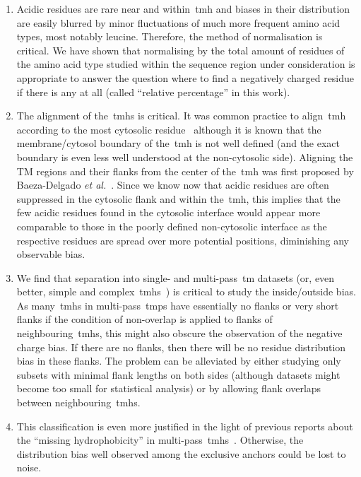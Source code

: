 \begin{enumerate}[i]
  \item Acidic residues are rare near and within~\gls{tmh} and biases in their distribution are easily blurred by minor fluctuations of much more frequent amino acid types, most notably leucine.
Therefore, the method of normalisation is critical.
We have shown that normalising by the total amount of residues of the amino acid type studied within the sequence region under consideration is appropriate to answer the question where to find a negatively charged residue if there is any at all (called ``relative percentage'' in this work).
  \item The alignment of the~\gls{tmh}s is critical.
It was common practice to align~\gls{tmh} according to the most cytosolic residue~\cite{Sharpe2010} although it is known that the membrane/cytosol boundary of the~\gls{tmh} is not well defined (and the exact boundary is even less well understood at the non-cytosolic side).
Aligning the TM regions and their flanks from the center of the~\gls{tmh} was first proposed by Baeza-Delgado \textit{et al.}~\cite{Baeza-Delgado2013}.
Since we know now that acidic residues are often suppressed in the cytosolic flank and within the~\gls{tmh}, this implies that the few acidic residues found in the cytosolic interface would appear more comparable to those in the poorly defined non-cytosolic interface as the respective residues are spread over more potential positions, diminishing any observable bias.
  \item We find that separation into single- and multi-pass~\gls{tm} datasets (or, even better, simple and complex~\gls{tmh}s~\cite{Wong2011, Wong2012}) is critical to study the inside/outside bias.
As many~\gls{tmh}s in multi-pass~\gls{tmp}s have essentially no flanks or very short flanks if the condition of non-overlap is applied to flanks of neighbouring~\gls{tmh}s, this might also obscure the observation of the negative charge bias.
If there are no flanks, then there will be no residue distribution bias in these flanks.
The problem can be alleviated by either studying only subsets with minimal flank lengths on both sides (although datasets might become too small for statistical analysis) or by allowing flank overlaps between neighbouring~\gls{tmh}s.
  \item This classification is even more justified in the light of previous reports about the ``missing hydrophobicity'' in multi-pass~\gls{tmh}s~\cite{Nilsson1990, Hedin2010, Hessa2007, Ojemalm2012}.
Otherwise, the distribution bias well observed among the exclusive anchors could be lost to noise.

\end{enumerate}

